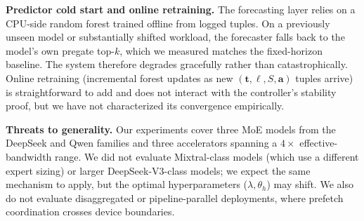 \textbf{Predictor cold start and online retraining.}
The forecasting layer relies on a CPU-side random forest trained
offline from logged tuples. On a previously unseen model or
substantially shifted workload, the forecaster falls back to the
model's own pregate top-$k$, which we measured matches the
fixed-horizon baseline. The system therefore degrades gracefully
rather than catastrophically. Online retraining (incremental forest
updates as new $(\mathbf{t},\ell,S,\mathbf{a})$ tuples arrive) is
straightforward to add and does not interact with the controller's
stability proof, but we have not characterized its convergence
empirically.

\textbf{Threats to generality.}
Our experiments cover three MoE models from the DeepSeek and Qwen
families and three accelerators spanning a $4\times$ effective-bandwidth
range. We did not evaluate Mixtral-class models (which use a different
expert sizing) or larger DeepSeek-V3-class models; we expect the same
mechanism to apply, but the optimal hyperparameters
($\lambda, \theta_h$) may shift. We also do not evaluate disaggregated
or pipeline-parallel deployments, where prefetch coordination crosses
device boundaries.